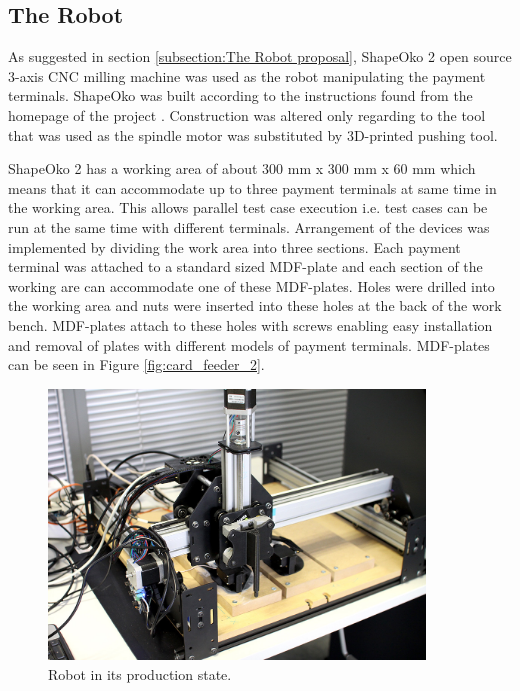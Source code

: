\subsection{The Robot}
\label{subsection:Robot}

As suggested in section \ref{subsection:The Robot proposal}, ShapeOko 2 open source 3-axis CNC milling machine was used as the robot manipulating the payment terminals. ShapeOko was built according to the instructions found from the homepage of the project \citep{shapeoko}. Construction was altered only regarding to the tool that was used as the spindle motor was substituted by 3D-printed pushing tool.

ShapeOko 2 has a working area of about 300 mm x 300 mm x 60 mm which means that it can accommodate up to three payment terminals at same time in the working area. This allows parallel test case execution i.e. test cases can be run at the same time with different terminals. Arrangement of the devices was implemented by dividing the work area into three sections. Each payment terminal was attached to a standard sized MDF-plate and each section of the working are can accommodate one of these MDF-plates. Holes were drilled into the working area and nuts were inserted into these holes at the back of the work bench. MDF-plates attach to these holes with screws enabling easy installation and removal of plates with different models of payment terminals. MDF-plates can be seen in Figure \ref{fig:card_feeder_2}.

\begin{figure}[ht]
  \begin{center}
    \includegraphics[width=10cm]{images/robot.jpg}
    \caption{Robot in its production state.}
    \label{fig:robot_final}
  \end{center}
\end{figure}
\FloatBarrier

